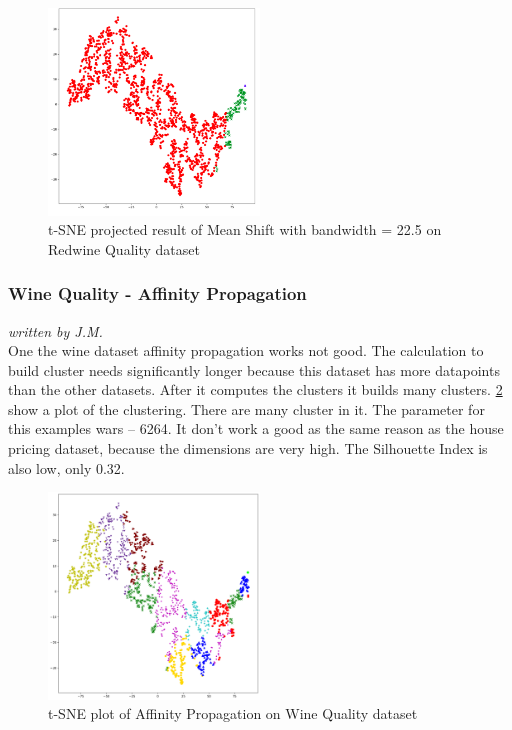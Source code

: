 \begin{figure}[H]
\begin{center}
\includegraphics[width=0.5\textwidth]{images/Meanshift_Wine_22_5.png}
\caption{t-SNE projected result of Mean Shift with bandwidth = 22.5 on Redwine Quality dataset}
\end{center}
\label{fig:meanshift_wine_22_5}
\end{figure}

\subsubsection{Wine Quality - Affinity Propagation}
\textit{written by J.M.}\\

One the wine dataset affinity propagation works not good. The calculation to build cluster needs significantly longer because this dataset has more datapoints than the other datasets. After it computes the clusters it builds many clusters.  \ref{fig:af_wine1} show a plot of the clustering. There are many cluster in it. The parameter for this examples wars – 6264. It don’t work a good as the same reason as the house pricing dataset, because the dimensions are very high. The Silhouette Index is also low, only 0.32. 

\begin{figure}[H]
	\begin{center}
		\includegraphics[width=0.5\textwidth]{images/af_wine6533.png}
		\caption{t-SNE plot of Affinity Propagation on Wine Quality dataset}
	\end{center}
	\label{fig:af_wine1}
\end{figure}























